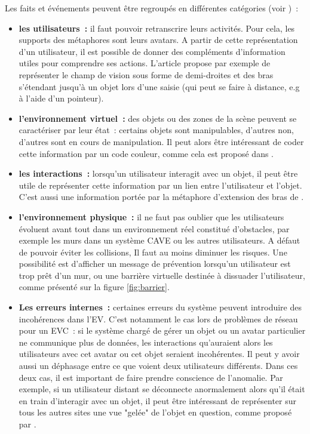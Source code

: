 \documentclass[11pt]{article}
\begin{document}
Les faits et événements peuvent être regroupés en différentes catégories (voir \cite{survey})~:
\begin{itemize}
	\item \textbf{les utilisateurs~:} il faut pouvoir retranscrire leurs activités. Pour cela, les supports des métaphores sont leurs avatars. A partir de cette représentation d'un utilisateur, il est possible de donner des compléments d'information utiles pour comprendre ses actions. L'article \cite{fraser} propose par exemple de représenter le champ de vision sous forme de demi-droites et des bras s'étendant jusqu'à un objet lors d'une saisie (qui peut se faire à distance, e.g à l'aide d'un pointeur).
	\item \textbf{l'environnement virtuel~:} des objets ou des zones de la scène peuvent se caractériser par leur état~: certains objets sont manipulables, d'autres non, d'autres sont en cours de manipulation. Il peut alors être intéressant de coder cette information par un code couleur, comme cela est proposé dans \cite{pinho}.
	\item \textbf{les interactions~:} lorsqu'un utilisateur interagit avec un objet, il peut être utile de représenter cette information par un lien entre l'utilisateur et l'objet. C'est aussi une information portée par la métaphore d'extension des bras de \cite{fraser}.
	\item \textbf{l'environnement physique~:} il ne faut pas oublier que les utilisateurs évoluent avant tout dans un environnement réel constitué d'obstacles, par exemple les murs dans un système CAVE ou les autres utilisateurs. A défaut de pouvoir éviter les collisions, Il faut au moins diminuer les risques. Une possibilité est d'afficher un message de prévention lorsqu'un utilisateur est trop prêt d'un mur, ou une barrière virtuelle destinée à dissuader l'utilisateur, comme présenté sur la figure \ref{fig:barrier}.
	\item \textbf{Les erreurs internes~:} certaines erreurs du système peuvent introduire des incohérences dans l'EV. C'est notamment le cas lors de problèmes de réseau pour un EVC~: si le système chargé de gérer un objet ou un avatar particulier ne communique plus de données, les interactions qu'auraient alors les utilisateurs avec cet avatar ou cet objet seraient incohérentes. Il peut y avoir aussi un déphasage entre ce que voient deux utilisateurs différents. Dans ces deux cas, il est important de faire prendre conscience de l'anomalie. Par exemple, si un utilisateur distant se déconnecte anormalement alors qu'il était en train d'interagir avec un objet, il peut être intéressant de représenter sur tous les autres sites une vue "gelée" de l'objet en question, comme proposé par \cite{network-errors}.
\end{itemize}
\end{document}
